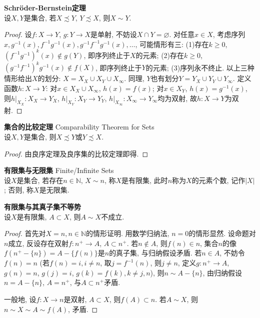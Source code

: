 \begin{thm}\textbf{Schröder-Bernstein定理}\\
设$X, Y$是集合, 若$X\precsim Y$, $Y\precsim X$, 则$X\sim Y$. 
\end{thm}
\begin{proof}
设$f:X\to Y$, $g:Y\to X$是单射, 不妨设$X\cap Y=\varnothing$. 对任意$x\in X$, 考虑序列$x, g^{-1}(x), f^{-1}g^{-1}(x), g^{-1}f^{-1}g^{-1}(x),\dots$, 可能情形有三: (1)存在$k\ge 0$, $(f^{-1}g^{-1})^k (x)\notin g(Y)$, 即序列终止于$X$的元素; (2)存在$k\ge 0$, $(g^{-1}f^{-1})^k g^{-1}(x)\notin f(X)$, 即序列终止于$Y$的元素; (3)序列永不终止. 以上三种情形给出$X$的划分: $X=X_X\cup X_Y\cup X_\infty$. 同理, $Y$也有划分$Y=Y_X\cup Y_Y\cup Y_\infty$. 定义函数$h:X\to Y$: 对$x\in X_X\cup X_\infty$, $h(x)=f(x)$; 对$x\in X_Y$, $h(x)=g^{-1}(x)$, 则$h|_{X_X}:X_X\to Y_X$, $h|_{X_Y}:X_Y\to Y_Y$, $h|_{X_\infty}:X_\infty\to Y_\infty$均为双射, 故$h:X\to Y$为双射.
\end{proof}

\begin{pro}\textbf{集合的比较定理} Comparability Theorem for
Sets\\
设$X,Y$是集合, 则$X\precsim Y$或$Y\precsim X$.
\end{pro}
\begin{proof}
    由良序定理及良序集的比较定理即得. 
\end{proof}

\begin{dfn} \textbf{有限集与无限集} Finite/Infinite Sets\\
设$X$是集合, 若存在$n\in \mathbb{N}$, $X\sim n$, 称$X$是有限集, 此时$n$称为$X$的元素个数, 记作$|X|$; 否则, 称$X$是无限集.
\end{dfn}

\begin{pro} \textbf{有限集与其真子集不等势}\\
设$X$是有限集, $A\subset X$, 则$A\sim X$不成立. 
\label{pro:finset_subset}
\end{pro}
\begin{proof}
首先对$X=n, n\in \mathbb{N}$的情形证明. 用数学归纳法, $n=0$的情形显然. 设命题对$n$成立, 反设存在双射$f: n^+\to A$, $A\subset n^+$. 若$n \notin A$, 则$f(n)\in n$, 集合$n$的像$f(n^+ - \{n\})=A-\{f(n)\}$是$n$的真子集, 与归纳假设矛盾. 若$n\in A$, 不妨令$f(n)=n$ (若$f(n)=i, i\neq n$, 取$j=f^{-1}(n)$, 则$j\neq n$, 定义$g:n^+\to A$, $g(n)=n$, $g(j)=i$, $g(k)=f(k), k\neq j,n$), 则$n \sim A-\{n\}$, 由归纳假设$n = A-\{n\}$, $A=n^+$, 与$A\subset n^+$矛盾. 
\par 一般地, 设$f: X\to n$是双射, $A\subset X$, 则$f(A)\subset n$. 若$A\sim X$, 则$n\sim X\sim A\sim f(A)$, 矛盾. 
\end{proof}

